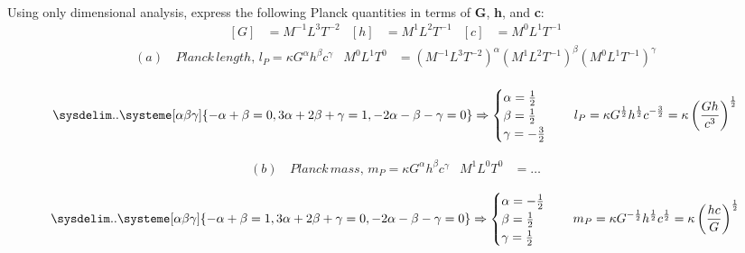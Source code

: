 \documentclass[]{article}
\newcommand{\bd}{\textbf}
\begin{document}
{		\paragraph{} Using only dimensional analysis, express the following Planck quantities in terms of \bd{G}, \bd{h}, and \bd{c}:
			\begin{equation*}
				\begin{aligned}
					\left[ G \right] &= M^{-1} L^3 T^{-2} & \left[ h \right] &= M^1 L^2 T^{-1}  & \left[ c \right] &= M^0 L^1 T^{-1} 
				\end{aligned}
			\end{equation*}
			\begin{equation*}
				\begin{aligned}
					(a) & \, Planck \, length, \, l_P = \kappa G^{\alpha} h^{\beta} c^{\gamma}  & M^0 L^1 T^0 &= (M^{-1} L^3 T^{-2})^{\alpha} (M^1 L^2 T^{-1})^{\beta} (M^0 L^1 T^{-1})^{\gamma}
					\\
				\end{aligned}
			\end{equation*}
				
				\begin{equation*}
					\sysdelim..\systeme[\alpha\beta\gamma]{
						-\alpha + \beta = 0, 
						3\alpha + 2\beta + \gamma = 1,
						-2\alpha - \beta - \gamma = 0
					}
					\Rightarrow
					\begin{cases}
						\alpha = \frac{1}{2} \\
						\beta = \frac{1}{2} \\
						\gamma = -\frac{3}{2}
					\end{cases}
					\quad
					l_P = \kappa G^{\frac{1}{2}} h^{\frac{1}{2}} c^{-\frac{3}{2}} = \kappa \left( \frac{Gh}{c^3} \right)^\frac{1}{2}
				\end{equation*}
			
			
			\begin{equation*}
				\begin{aligned}
					(b) & \, Planck \, mass, \, m_P = \kappa G^{\alpha} h^{\beta} c^{\gamma}  & M^1 L^0 T^0 &= \dots
					\\
				\end{aligned}
			\end{equation*}
				\begin{equation*}
					\sysdelim..\systeme[\alpha\beta\gamma]{
						-\alpha + \beta = 1, 
						3\alpha + 2\beta + \gamma = 0,
						-2\alpha - \beta - \gamma = 0
					} \Rightarrow
					\begin{cases}
						\alpha = -\frac{1}{2} \\ 
						\beta = \frac{1}{2} \\
						\gamma = \frac{1}{2}
					\end{cases}
					\quad
					m_P = \kappa G^{-\frac{1}{2}} h^{\frac{1}{2}} c^{\frac{1}{2}} = \kappa \left( \frac{hc}{G} \right)^\frac{1}{2}
				\end{equation*}
			
}
\end{document}
